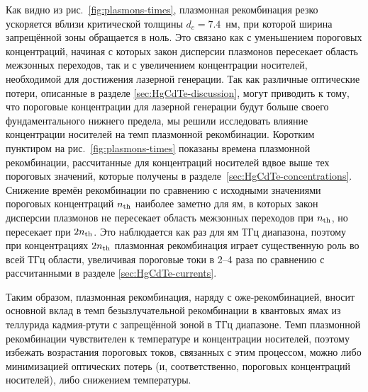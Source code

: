 Как видно из рис.~\ref{fig:plasmons-times}, плазмонная рекомбинация резко ускоряется вблизи критической толщины $d_c = 7.4$~нм, при которой ширина запрещённой зоны обращается в ноль. Это связано как с уменьшением пороговых концентраций, начиная с которых закон дисперсии плазмонов пересекает область межзонных переходов, так и с увеличением концентрации носителей, необходимой для достижения лазерной генерации. Так как различные оптические потери, описанные в разделе \ref{sec:HgCdTe-discussion}, могут приводить к тому, что пороговые концентрации для лазерной генерации будут больше своего фундаментального нижнего предела, мы решили исследовать влияние концентрации носителей на темп плазмонной рекомбинации. Коротким пунктиром на рис.~\ref{fig:plasmons-times} показаны времена плазмонной рекомбинации, рассчитанные для концентраций носителей вдвое выше тех пороговых значений, которые получены в разделе~\ref{sec:HgCdTe-concentrations}. Снижение времён рекомбинации по сравнению с исходными значениями пороговых концентраций $n_{\rm th}$ наиболее заметно для ям, в которых закон дисперсии плазмонов не пересекает область межзонных переходов при $n_{\rm th}$, но пересекает при $2 n_{\rm th}$. Это наблюдается как раз для ям ТГц диапазона, поэтому при концентрациях $2 n_{\rm th}$ плазмонная рекомбинация играет существенную роль во всей ТГц области, увеличивая пороговые токи в 2--4 раза по сравнению с рассчитанными в разделе \ref{sec:HgCdTe-currents}.

Таким образом, плазмонная рекомбинация, наряду с оже-рекомбинацией, вносит основной вклад в темп безызлучательной рекомбинации в квантовых ямах из теллурида кадмия-ртути с запрещённой зоной в ТГц диапазоне. Темп плазмонной рекомбинации чувствителен к температуре и концентрации носителей, поэтому избежать возрастания пороговых токов, связанных с этим процессом, можно либо минимизацией оптических потерь (и, соответственно, пороговых концентраций носителей), либо снижением температуры.